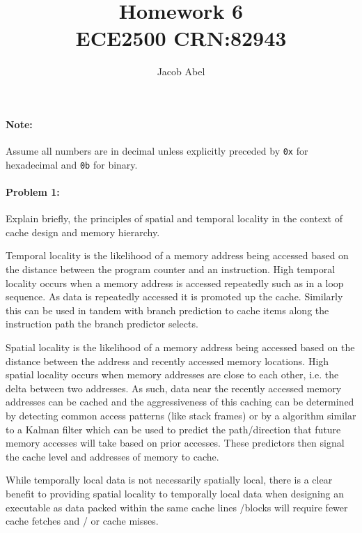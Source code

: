 \documentclass[12pt,letterpaper,titlepage]{article}
\author{Jacob Abel}
\title{	Homework 6
	\\\large ECE2500 CRN:82943
}
\begin{document}
\maketitle
\begin{raggedright}


\clearpage
\paragraph{Note: }Assume all numbers are in decimal unless explicitly preceded by \texttt{0x} for hexadecimal and \texttt{0b} for binary.

\paragraph{Problem 1: }
Explain briefly, the principles of spatial and temporal locality in the context of cache design and memory hierarchy.

Temporal locality is the likelihood of a memory address being accessed based on the distance between the program counter and an instruction. High temporal locality occurs when a memory address is accessed repeatedly such as in a loop sequence. As data is repeatedly accessed it is promoted up the cache. Similarly this can be used in tandem with branch prediction to cache items along the instruction path the branch predictor selects.

Spatial locality is the likelihood of a memory address being accessed based on the distance between the address and recently accessed memory locations. High spatial locality occurs when memory addresses are close to each other, i.e. the delta between two addresses. As such, data near the recently accessed memory addresses can be cached and the aggressiveness of this caching can be determined by detecting common access patterns (like stack frames) or by a algorithm similar to a Kalman filter which can be used to predict the path/direction that future memory accesses will take based on prior accesses. These predictors then signal the cache level and addresses of memory to cache.

While temporally local data is not necessarily spatially local, there is a clear benefit to providing spatial locality to temporally local data when designing an executable as data packed within the same cache lines /blocks will require fewer cache fetches and / or cache misses.


\end{raggedright}
\end{document}
